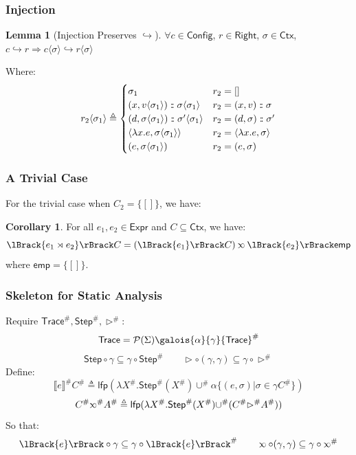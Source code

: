 \documentclass{beamer}
\theoremstyle{definition}
\newtheorem*{lemma*}{Lemma}
\newtheorem*{corollary*}{Corollary}
\newcommand*{\cons}{:{\hspace{-0.7em}}:}
\newcommand*{\pset}{\mathcal{P}}
\newcommand*{\Abs}[1]{{#1}^{\#}}
\newcommand*{\Expr}{\mathsf{Expr}}
\newcommand*{\modid}{d}
\newcommand*{\ctx}{\sigma}
\newcommand*{\Ctx}{\mathsf{Ctx}}
\newcommand*{\Trace}{\mathsf{Trace}}
\newcommand*{\Config}{\mathsf{Config}}
\newcommand*{\config}{c}
\newcommand*{\Right}{\mathsf{Right}}
\newcommand*{\rightst}{r}
\newcommand*{\lfp}{\mathsf{lfp}}
\newcommand*{\Step}{\mathsf{Step}}
\newcommand*{\semarrow}{\hookrightarrow}
\newcommand*{\semlink}{\mathbin{\rotatebox[origin=c]{180}{$\propto$}}}
\newcommand*{\link}[2]{{#1}\rtimes{#2}}
\newcommand*{\mt}{\mathsf{emp}}
\newcommand*{\sembracket}[1]{\lBrack{#1}\rBrack}
\newcommand*{\inject}[2]{{#2}\langle{#1}\rangle}
\begin{document}
\begin{frame}[c]
  \frametitle{Injection}
  \begin{lemma*}[Injection Preserves $\semarrow$]\label{lem:injpreseval}
    $\forall\config\in\Config$, $\rightst\in\Right$, $\ctx\in\Ctx$,
    $\config\semarrow\rightst\Rightarrow\inject{\ctx}{\config}\semarrow\inject{\ctx}{\rightst}$
  \end{lemma*}

  Where:
    {\footnotesize
      \[
        \inject{\ctx_{1}}{r_{2}}\triangleq
        \begin{cases}
          \ctx_1                                                         & r_{2}=[]                           \\
          (x, \inject{\ctx_1}{v})\cons\inject{\ctx_{1}}{\ctx}            & r_{2}=(x,v)\cons \ctx              \\
          (\modid, \inject{\ctx_{1}}{\ctx})\cons\inject{\ctx_{1}}{\ctx'} & r_{2}=(\modid,\ctx)\cons \ctx'     \\
          \langle\lambda x.e,\inject{\ctx_1}{\ctx}\rangle                & r_2=\langle\lambda x.e,\ctx\rangle \\
          (e,\inject{\ctx_1}{\ctx})                                      & r_2 = (e, \ctx)
        \end{cases}
      \]}%
\end{frame}
\begin{frame}[c]
  \frametitle{A Trivial Case}
  For the trivial case when $C_2=\{[]\}$, we have:
  \begin{corollary*} For all $e_1,e_2\in\Expr$ and $C\subseteq\Ctx$, we have:
    \[\sembracket{\link{e_1}{e_2}}C=(\sembracket{e_1}C)\semlink\sembracket{e_2}\mt\]
    where $\mt=\{[]\}$.
  \end{corollary*}
\end{frame}
\begin{frame}[c]
  \frametitle{Skeleton for Static Analysis}
  Require $\Abs{\Trace},\Abs{\Step},\Abs{\rhd}$:
  \[\Trace=\pset(\Sigma)\galois{\alpha}{\gamma}\Abs{\Trace}\]
  \[\Step\circ\gamma\subseteq\gamma\circ\Abs\Step\qquad\rhd\circ(\gamma,\gamma)\subseteq\gamma\circ\Abs\rhd\]
  Define:
  \[\Abs{\sembracket{e}}\Abs{C}\triangleq\lfp(\lambda\Abs{X}.\Abs\Step(\Abs{X})\Abs\cup\alpha\{(e,\ctx)|\ctx\in\gamma\Abs{C}\})\]
  \[\Abs{C}\Abs\semlink\Abs{A}\triangleq\lfp(\lambda\Abs{X}.\Abs\Step(\Abs{X})\Abs\cup(\Abs{C}\Abs\rhd\Abs{A}))\]
  So that:
  \[\sembracket{e}\circ\gamma\subseteq\gamma\circ\Abs{\sembracket{e}}\qquad\semlink\circ(\gamma,\gamma)\subseteq\gamma\circ\Abs\semlink\]
\end{frame}
\end{document}
